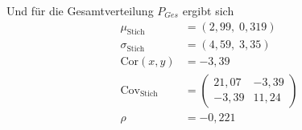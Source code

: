 Und für die Gesamtverteilung $P_{Ges}$ ergibt sich
\begin{align}
  \mu_{\text{Stich}}         &=\left(2,99,\;  0,319\right)\\
  \sigma_{\text{Stich}}      &=\left(4,59,\;  3,35\right)\\
  \text{Cor}(x,y)            &=-3,39\\
  \text{Cov}_{\text{Stich}}  &=\left(
  \begin{array}{rr}
    21,07   & -3,39\\
    -3,39   & 11,24
  \end{array}
                            \right)\\
  \rho                       &=-0,221
\end{align}

